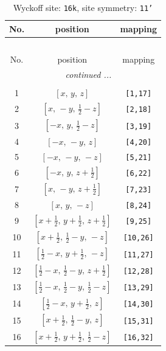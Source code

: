 \documentclass[fleqn,8pt]{jsarticle}
\begin{document}
\begin{longtable}{ccc}
\caption{Wyckoff site: {\tt 16k}, site symmetry: {\tt 11'}}
 \\
 \hline \hline
No. & position & mapping \\ \hline \endfirsthead

\multicolumn{2}{l}{\tablename\ \thetable{}} \\
 \hline \hline
No. & position & mapping \\ \hline \endhead

 \hline \hline
\multicolumn{2}{r}{\footnotesize\it continued ...} \\ \endfoot

 \hline \hline
\multicolumn{2}{r}{} \\ \endlastfoot

1 & $\left[ x,\, y,\, z \right]$ & {\tt [1,17]} \\ \hline
2 & $\left[ x,\, - y,\, \frac{1}{2} - z \right]$ & {\tt [2,18]} \\ \hline
3 & $\left[ - x,\, y,\, \frac{1}{2} - z \right]$ & {\tt [3,19]} \\ \hline
4 & $\left[ - x,\, - y,\, z \right]$ & {\tt [4,20]} \\ \hline
5 & $\left[ - x,\, - y,\, - z \right]$ & {\tt [5,21]} \\ \hline
6 & $\left[ - x,\, y,\, z + \frac{1}{2} \right]$ & {\tt [6,22]} \\ \hline
7 & $\left[ x,\, - y,\, z + \frac{1}{2} \right]$ & {\tt [7,23]} \\ \hline
8 & $\left[ x,\, y,\, - z \right]$ & {\tt [8,24]} \\ \hline
9 & $\left[ x + \frac{1}{2},\, y + \frac{1}{2},\, z + \frac{1}{2} \right]$ & {\tt [9,25]} \\ \hline
10 & $\left[ x + \frac{1}{2},\, \frac{1}{2} - y,\, - z \right]$ & {\tt [10,26]} \\ \hline
11 & $\left[ \frac{1}{2} - x,\, y + \frac{1}{2},\, - z \right]$ & {\tt [11,27]} \\ \hline
12 & $\left[ \frac{1}{2} - x,\, \frac{1}{2} - y,\, z + \frac{1}{2} \right]$ & {\tt [12,28]} \\ \hline
13 & $\left[ \frac{1}{2} - x,\, \frac{1}{2} - y,\, \frac{1}{2} - z \right]$ & {\tt [13,29]} \\ \hline
14 & $\left[ \frac{1}{2} - x,\, y + \frac{1}{2},\, z \right]$ & {\tt [14,30]} \\ \hline
15 & $\left[ x + \frac{1}{2},\, \frac{1}{2} - y,\, z \right]$ & {\tt [15,31]} \\ \hline
16 & $\left[ x + \frac{1}{2},\, y + \frac{1}{2},\, \frac{1}{2} - z \right]$ & {\tt [16,32]} \\
\end{longtable}
\end{document}
